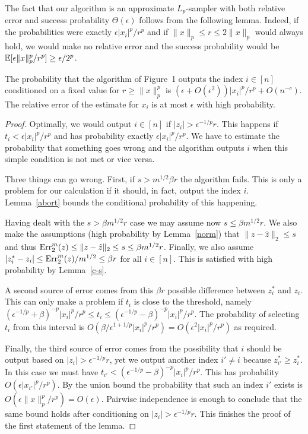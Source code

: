 The fact that our algorithm is an approximate $L_p$-sampler with both relative
error and success probability $\Theta(\epsilon)$ follows from the following
lemma. Indeed, if the probabilities were exactly $\epsilon|x_i|^p/r^p$ and
if $\|x\|_p\le r\le2\|x\|_p$ would always hold, we
would make no relative error and the success probability would be
$\operatorname*{\mathbb{E}}[\epsilon\|x\|_p^p/r^p]\ge\epsilon/2^p$.

\begin{lemma} \label{lps}
The probability that the algorithm of Figure~1 outputs the index
$i\in[n]$ conditioned on a fixed value for $r\ge\|x\|_p^p$ is
$(\epsilon+O(\epsilon^2))|x_i|^p/r^p+O(n^{-c})$. The
relative error of the estimate for $x_i$ is at most $\epsilon$ with high
probability.
\end{lemma}

\begin{proof} Optimally, we would output $i\in[n]$ if
$|z_i|>\epsilon^{-1/p}r$. This happens if $t_i<\epsilon|x_i|^p/r^p$ and
has probability exactly $\epsilon|x_i|^p/r^p$. We have to estimate the
probability that something goes wrong and the algorithm outputs $i$ when this
simple condition is not met or vice versa.

Three things can go wrong. First, if $s>m^{1/2}\beta r$ the algorithm
fails. This is only a problem for our calculation if it should, in fact,
output the index $i$. Lemma~\ref{abort} bounds the conditional
probability of this happening.

Having dealt with the $s>\beta m^{1/2}r$ case we may assume now $s\le\beta
m^{1/2} r$. We also make the assumptions (high probability by
Lemma~\ref{norm}) that
$\|z-\hat z\|_2\le s$ and thus $\operatorname{Err}_2^m(z)\le\|z-\hat z\|_2\le s\le\beta
m^{1/2}r$. Finally, we also assume $|z^*_i-z_i|\le\operatorname{Err}_2^m(z)/m^{1/2}\le\beta
r$ for all $i\in[n]$. This is satisfied with high probability by
Lemma~\ref{c-s}.

A second source of error comes from this $\beta r$ possible difference
between $z^*_i$ and $z_i$. This can only make a problem if $t_i$ is
close to the threshold, namely $(\epsilon^{-1/p}+\beta)^{-p}|x_i|^p/r^p\le
t_i\le (\epsilon^{-1/p}-\beta)^{-p}|x_i|^p/r^p$. The probability of selecting
$t_i$ from this interval is
$O(\beta/\epsilon^{1+1/p}|x_i|^p/r^p)=O(\epsilon^2|x_i|^p/r^p)$ as required.

Finally, the third source of error comes from the possibility that $i$ should
be output based on $|z_i|>\epsilon^{-1/p}r$, yet we output another index
$i'\ne i$ because $z^*_{i'}\ge z^*_i$. In this case we
must have $t_{i'}<(\epsilon^{-1/p}-\beta)^{-p}|x_i|^p/r^p$. This has
probability $O(\epsilon|x_{i'}|^p/r^p)$. By the union bound the probability
that such an index $i'$ exists is
$O(\epsilon\|x\|_p^p/r^p)=O(\epsilon)$. Pairwise independence is enough to
conclude that the same bound holds after conditioning on
$|z_i|>\epsilon^{-1/p}r$. This finishes the proof of the first statement of
the lemma.


\end{proof}
